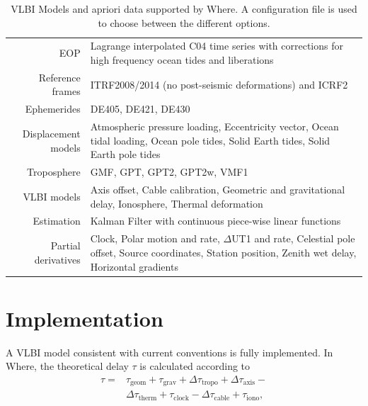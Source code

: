 \documentclass[natbib,twocolumn,twoside]{svmultiag}
\begin{document}
\begin{table}[t]
\begin{tabularx}{\textwidth}{r|X}
  \textcolor{black!99}{EOP}
    & \textcolor{black!99}{Lagrange interpolated C04 time series with
                           corrections for high frequency ocean tides and
                           liberations} \\
\textcolor{black!60}{Reference frames}
    & \textcolor{black!60}{ITRF2008/2014 (no post-seismic deformations) and ICRF2} \\
  \textcolor{black!99}{Ephemerides}
    & \textcolor{black!99}{DE405, DE421, DE430} \\
  \textcolor{black!60}{Displacement models}
    & \textcolor{black!60}{Atmospheric pressure loading, Eccentricity vector,
                           Ocean tidal loading, Ocean pole tides, Solid Earth
                           tides, Solid Earth pole tides} \\
  \textcolor{black!99}{Troposphere}
    & \textcolor{black!99}{GMF, GPT, GPT2, GPT2w, VMF1} \\
  \textcolor{black!60}{VLBI models}
    & \textcolor{black!60}{Axis offset, Cable calibration, Geometric and
                           gravitational delay, Ionosphere, Thermal
                           deformation} \\
  \textcolor{black!99}{Estimation}
    & \textcolor{black!99}{Kalman Filter with continuous piece-wise linear
                           functions} \\
  \textcolor{black!60}{Partial derivatives}
    & \textcolor{black!60}{Clock, Polar motion and rate, $\Delta$UT1 and rate,
                           Celestial pole offset, Source coordinates, Station
                           position, Zenith wet delay, Horizontal gradients} \\
\end{tabularx}
\caption{VLBI Models and apriori data supported by Where. A configuration file
  is used to choose between the different options.}
\label{tbl:models}
\end{table}


\section{Implementation}

A VLBI model consistent with current conventions is fully implemented. In Where,
the theoretical delay $\tau$ is calculated according to
\begin{align}
  \nonumber \tau =& \tau_{\text{geom}} + \tau_{\text{grav}} + \Delta\tau_{\text{tropo}}
                    + \Delta\tau_{\text{axis}} - \\
                  & \Delta\tau_{\text{therm}} + \tau_{\text{clock}}
                    - \Delta\tau_{\text{cable}} + \tau_{\text{iono}} ,
  \label{eq:theoretical_delay}
\end{align}
\end{document}
